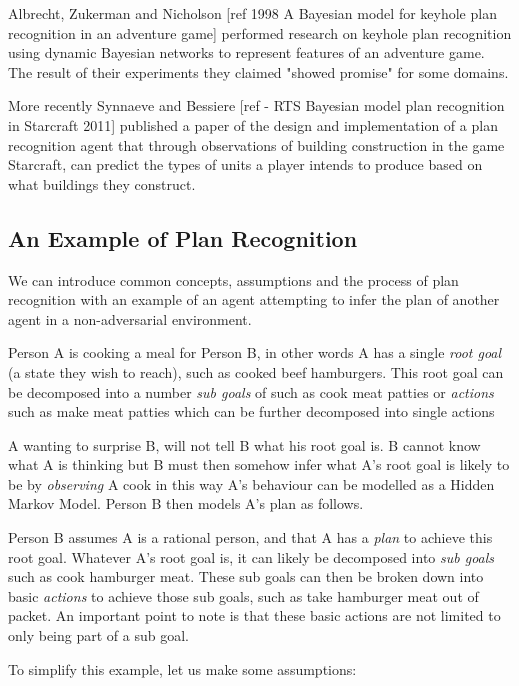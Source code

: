\documentclass[parskip]{cs4rep}
\begin{document}
Albrecht, Zukerman and Nicholson [ref 1998 A Bayesian model for keyhole plan recognition in an adventure game] performed research on keyhole plan recognition using dynamic Bayesian networks to represent features of an adventure game. The result of their experiments they claimed "showed promise" for some domains. 

More recently Synnaeve and Bessiere [ref - RTS Bayesian model plan recognition in Starcraft 2011] published a paper of the design and implementation of a plan recognition agent that through observations of building construction in the game Starcraft, can predict the types of units a player intends to produce based on what buildings they construct.

\subsection{An Example of Plan Recognition}

We can introduce common concepts, assumptions and the process of plan recognition with an example of an agent attempting to infer the plan of another agent in a non-adversarial environment. 

Person A is cooking a meal for Person B, in other words A has a single \textit{root goal} (a state they wish to reach), such as cooked beef hamburgers. This root goal can be decomposed into a number \textit{sub goals} of such as cook meat patties or \textit{actions} such as make meat patties  which can be further decomposed into single actions

A wanting to surprise B, will not tell B what his root goal is. B cannot know what A is thinking but B must then somehow infer what A's root goal is likely to be by \textit{observing} A cook in this way A's behaviour can be modelled as a Hidden Markov Model. Person B then models A's plan as follows. 

Person B assumes A is a rational person, and that A has a \textit{plan} to achieve this root goal. Whatever A's root goal is, it can likely be decomposed into \textit{sub goals} such as cook hamburger meat. These sub goals can then be broken down into basic \textit{actions} to achieve those sub goals, such as take hamburger meat out of packet. An important point to note is that these basic actions are not limited to only being part of a sub goal.

To simplify this example, let us make some assumptions:
\end{document}
